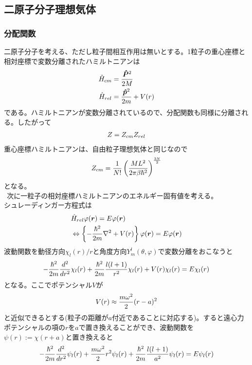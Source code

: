 \documentclass{jsarticle}  %
\numberwithin{equation}{section} %
\numberwithin{figure}{section}
\begin{document}
\subsection{二原子分子理想気体}
\subsubsection{分配関数}
    二原子分子を考える、ただし粒子間相互作用は無いとする。1粒子の重心座標と相対座標で変数分離されたハミルトニアンは
    \begin{align}
        \hat{H}_{cm} &= \frac{\bm{\hat{P}}^2}{2M} \notag \\
        \hat{H}_{rel} &= \frac{\bm{\hat{p}}^2}{2m} + V(r) \notag 
    \end{align}
    である。ハミルトニアンが変数分離されているので、分配関数も同様に分離される。したがって
    \begin{align}
        Z = Z_{cm}Z_{rel} \notag 
    \end{align}
    重心座標ハミルトニアンは、自由粒子理想気体と同じなので
    \begin{align}
        Z_{cm} = \frac{1}{N!} \left( \frac{ML^2}{2\pi \beta \hbar^2 } \right)^{\frac{3N}{2}} \notag 
    \end{align}
    となる。\\
    $\ \ $次に一粒子の相対座標ハミルトニアンのエネルギー固有値を考える。\\
    シュレーディンガー方程式は
    \begin{align}
        &\hat{H}_{rel} \varphi(\bm{r}) = E\varphi(\bm{r}) \notag \\
        &\Leftrightarrow \left\{ -\frac{\hbar^2}{2m}\nabla^2 + V(r)\right\} \varphi(\bm{r}) = E\varphi(\bm{r}) \notag 
    \end{align}
    波動関数を動径方向$\chi_l(r) / r$と角度方向$Y^l_m(\theta,\varphi)$で変数分離をおこなうと
    \begin{align}
        -\frac{\hbar^2}{2m} \frac{d^2}{dr^2} \chi_l(r) + \frac{\hbar^2}{2m} \frac{l(l+1)}{r^2} \chi_l(r) + V(r) \chi_l(r) = E\chi_l(r) \notag 
    \end{align}
    となる。ここでポテンシャル$V$が
    \begin{align}
        V(r) \approx \frac{m\omega^2}{2}(r-a)^2 \notag
    \end{align}
    と近似できるとする(粒子の距離が$a$付近であることに対応する)。すると遠心力ポテンシャルの項の$r$を$a$で置き換えることができ、波動関数を$\psi(r) := \chi(r+a)$と置き換えると
    \begin{align}
        -\frac{\hbar^2}{2m} \frac{d^2}{dr^2} \psi_l(r) + \frac{m\omega^2}{2}r^2 \psi_l(r) + \frac{\hbar^2}{2m} \frac{l(l+1)}{a^2} \psi_l(r) = E\psi_l(r) \notag 
    \end{align}
\end{document}
